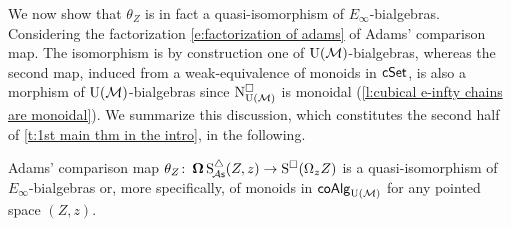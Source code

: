 We now show that $\theta_Z$ is in fact a quasi-isomorphism of $E_{\infty}$-bialgebras.
Considering the factorization \eqref{e:factorization of adams} of Adams' comparison map.
The isomorphism is by construction one of ${\operatorname{U}(\mathcal{M})}$-bialgebras, whereas the second map, induced from a weak-equivalence of monoids in $\mathsf{cSet}$, is also a morphism of ${\operatorname{U}(\mathcal{M})}$-bialgebras
since $\operatorname{N^{\square}_{{\operatorname{U}(\mathcal{M})}}}$ is monoidal (\cref{l:cubical e-infty chains are monoidal}).
We summarize this discussion, which constitutes the second half of \cref{t:1st main thm in the intro}, in the following.

\begin{lemma} \label{l:adams comparison is an e-infty bialgebra map}
	Adams' comparison map $\theta_Z \colon \operatorname{\mathbf{\Omega}} \operatorname{S^{\triangle}_{\!{\mathcal{A}\mathsf{s}}}}(Z,z) \to \operatorname{S^{\square}}(\Omega_z Z)$ is a quasi-isomorphism of $E_{\infty}$-bialgebras or, more specifically, of monoids in $\mathsf{coAlg}_{\operatorname{U}(\mathcal{M})}$ for any pointed space $(Z,z)$.
\end{lemma}
